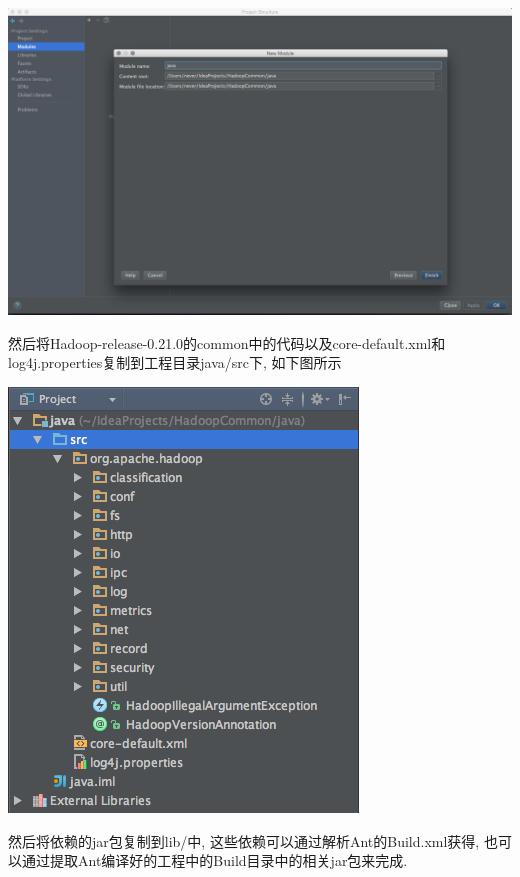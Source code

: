 \includegraphics[width=\textwidth]{image/env/cr25.png}

然后将Hadoop-release-0.21.0的common中的代码以及core-default.xml和log4j.properties复制到工程目录java/src下, 如下图所示

\includegraphics[width=\textwidth]{image/env/cr26.png}

然后将{\Hadoop}依赖的jar包复制到lib/中, 这些依赖可以通过解析Ant的Build.xml获得,
也可以通过提取Ant编译好的工程中的Build目录中的相关jar包来完成.


